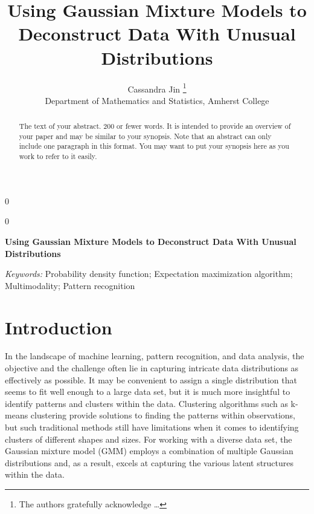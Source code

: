 \documentclass[12pt]{article}
\newcommand{\blind}{0}
\begin{document}
\def\spacingset#1{\renewcommand{\baselinestretch}%
{#1}\small\normalsize} \spacingset{1}



\blind
{
  \title{\bf Using Gaussian Mixture Models to Deconstruct Data With
Unusual Distributions}

  \author{
        Cassandra Jin \thanks{The authors gratefully acknowledge
\ldots{}} \\
    Department of Mathematics and Statistics, Amherst College\\
      }
  \maketitle
} \fi

\blind
{
  \bigskip
  \bigskip
  \bigskip
  \begin{center}
    {\LARGE\bf Using Gaussian Mixture Models to Deconstruct Data With
Unusual Distributions}
  \end{center}
  \medskip
} \fi

\bigskip
\begin{abstract}
The text of your abstract. 200 or fewer words. It is intended to provide
an overview of your paper and may be similar to your synopsis. Note that
an abstract can only include one paragraph in this format. You may want
to put your synopsis here as you work to refer to it easily.
\end{abstract}

\noindent%
{\it Keywords:} Probability density function; Expectation maximization
algorithm; Multimodality; Pattern recognition

\vfill

\newpage
\spacingset{1.9} %

\hypertarget{introduction}{%
\section{Introduction}\label{introduction}}

In the landscape of machine learning, pattern recognition, and data
analysis, the objective and the challenge often lie in capturing
intricate data distributions as effectively as possible. It may be
convenient to assign a single distribution that seems to fit well enough
to a large data set, but it is much more insightful to identify patterns
and clusters within the data. Clustering algorithms such as k-means
clustering provide solutions to finding the patterns within
observations, but such traditional methods still have limitations when
it comes to identifying clusters of different shapes and sizes. For
working with a diverse data set, the Gaussian mixture model (GMM)
employs a combination of multiple Gaussian distributions and, as a
result, excels at capturing the various latent structures within the
data. \citep{kumar2022gaussian}
\end{document}

